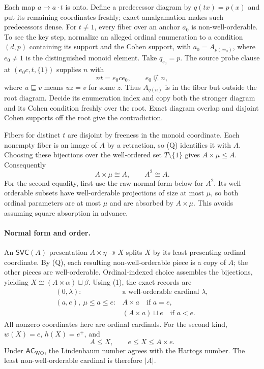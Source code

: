 Each map $a\mapsto a\cdot t$ is onto. Define a predecessor diagram by
$q(tx)=p(x)$ and put its remaining coordinates freshly; exact amalgamation
makes such predecessors dense. For $t\ne1$, every fiber over an anchor
$a_0$ is non-well-orderable. To see the key step, normalize an alleged
ordinal enumeration to a condition $(d,p)$ containing its support and the
Cohen support, with $a_0=A_{p(ce_0)}$, where $e_0\ne1$ is the distinguished
monoid element. Take $q_{e_0}=p$. The source probe clause at
$(e_0c,t,\{1\})$ supplies $n$ with
\[
                   nt=e_0ce_0,\qquad e_0\not\sqsubseteq n,
\]
where $u\sqsubseteq v$ means $uz=v$ for some $z$.
Thus $A_{q(n)}$ is in the fiber but outside the root diagram. Decide its
enumeration index and copy both the stronger diagram and its Cohen
condition freshly over the root. Exact diagram overlap and disjoint
Cohen supports off the root give the contradiction.

Fibers for distinct $t$ are disjoint by freeness in the monoid coordinate.
Each nonempty fiber is an image of $A$ by a retraction, so (Q) identifies
it with $A$. Choosing these bijections over the well-ordered set
$T\setminus\{1\}$ gives $A\times\mu\leq A$. Consequently
\[
                  A\times\mu\cong A,\qquad A^2\cong A.       \tag{1}
\]
For the second equality, first use the raw normal form below for $A^2$.
Its well-orderable subsets have well-orderable projections of size at most
$\mu$, so both ordinal parameters are at most $\mu$ and are absorbed by
$A\times\mu$. This avoids assuming square absorption in advance.

\paragraph{Normal form and order.}
An $\mathsf{SVC}(A)$ presentation $A\times\eta\twoheadrightarrow X$ splits
$X$ by its least presenting ordinal coordinate. By (Q), each resulting
non-well-orderable piece is a copy of $A$; the other pieces are
well-orderable. Ordinal-indexed choice assembles the bijections, yielding
$X\cong(A\times\alpha)\sqcup\beta$.
Using (1), the exact records are
\[
 \begin{array}{ll}
 (0,\lambda):&\text{a well-orderable cardinal }\lambda,\\
 (a,e),\ \mu\leq a\leq e:
   & A\times a\quad\text{if }a=e,\\[-2pt]
   &(A\times a)\sqcup e\quad\text{if }a<e.
 \end{array}                                                    \tag{2}
\]
All nonzero coordinates here are ordinal cardinals. For the second kind,
$w(X)=e$, $h(X)=e^+$, and
\[
             A\leq X,\qquad e\leq X\leq A\times e.
\]
Under $\mathsf{AC}_{\mathrm{WO}}$, the Lindenbaum number agrees with the
Hartogs number. The least non-well-orderable cardinal is therefore $|A|$.

